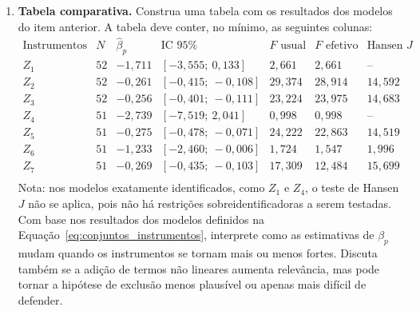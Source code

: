 \documentclass[12pt,a4paper]{article}
\begin{document}
\begin{enumerate}[label=\textbf{\arabic*.}]
Em conjunto, os resultados mostram que as especificações com apenas um instrumento linear, especialmente $Z_1$ e $Z_4$, apresentam sinais de fraqueza no primeiro estágio e produzem estimativas mais instáveis. Já as especificações que incluem termos quadráticos, como $Z_2$, $Z_3$, $Z_5$ e $Z_7$, aumentam substancialmente a relevância dos instrumentos e levam a estimativas de $\beta_p$ próximas de $-0{,}26$ a $-0{,}28$. No entanto, esse ganho de relevância estatística deve ser interpretado com cautela: a inclusão de termos não lineares pode melhorar o ajuste do primeiro estágio, mas também torna a defesa econômica da hipótese de exclusão mais delicada, pois é necessário sustentar que não apenas $z_t$, mas também suas transformações e defasagens, afetam a demanda por frango apenas por meio do preço do frango.

\item \textbf{Tabela comparativa.} Construa uma tabela com os resultados dos
    modelos do item anterior. A tabela deve conter, no mínimo, as seguintes colunas:
    \[
    \begin{array}{c|c|c|c|c|c|c}
    \text{Instrumentos} 
    & N 
    & \hat{\beta}_p 
    & \text{IC 95\%} 
    & F\text{ usual} 
    & F\text{ efetivo MOP} 
    & \text{Hansen } J \\
    \hline
    Z_1 
    & 52 
    & -1{,}711 
    & [-3{,}555;\ 0{,}133] 
    & 2{,}661 
    & 2{,}661 
    & \text{--} \\

    Z_2 
    & 52 
    & -0{,}261 
    & [-0{,}415;\ -0{,}108] 
    & 29{,}374 
    & 28{,}914 
    & 14{,}592 \\

    Z_3 
    & 52 
    & -0{,}256 
    & [-0{,}401;\ -0{,}111] 
    & 23{,}224 
    & 23{,}975 
    & 14{,}683 \\

    Z_4 
    & 51 
    & -2{,}739 
    & [-7{,}519;\ 2{,}041] 
    & 0{,}998 
    & 0{,}998 
    & \text{--} \\

    Z_5 
    & 51 
    & -0{,}275 
    & [-0{,}478;\ -0{,}071] 
    & 24{,}222 
    & 22{,}863 
    & 14{,}519 \\

    Z_6 
    & 51 
    & -1{,}233 
    & [-2{,}460;\ -0{,}006] 
    & 1{,}724 
    & 1{,}547 
    & 1{,}996 \\

    Z_7 
    & 51 
    & -0{,}269 
    & [-0{,}435;\ -0{,}103] 
    & 17{,}309 
    & 12{,}484 
    & 15{,}699 \\
\end{array}
\]
\noindent
Nota: nos modelos exatamente identificados, como $Z_1$ e $Z_4$, o teste de Hansen $J$ não se aplica, pois não há restrições sobreidentificadoras a serem testadas.
   Com base nos resultados dos modelos definidos na Equação~\eqref{eq:conjuntos_instrumentos}, interprete como as estimativas de $\beta_p$ mudam quando os instrumentos se
    tornam mais ou menos fortes. Discuta também se a adição de termos não lineares
    aumenta relevância, mas pode tornar a hipótese de exclusão menos plausível ou
    apenas mais difícil de defender.


\end{enumerate}
\end{document}
